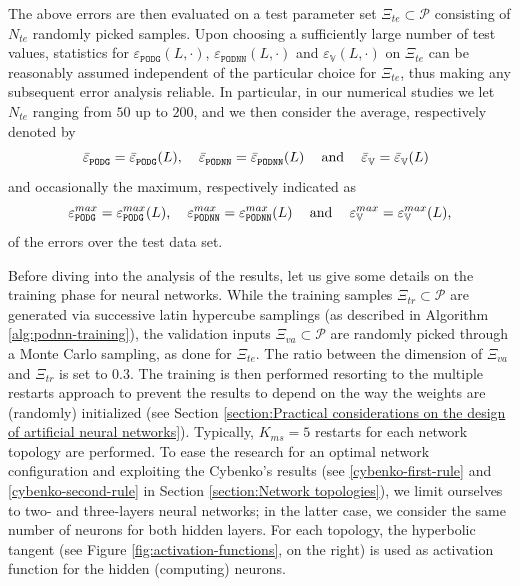 \documentclass[12pt, a4paper, twoside, openright]{report}
\numberwithin{equation}{chapter}
\theoremstyle{theorem}
\theoremstyle{definition}
\theoremstyle{remark}
\theoremstyle{proposition}
\numberwithin{figure}{chapter}
\begin{document}
		The above errors are then evaluated on a test parameter set $\Xi_{te} \subset \mathcal{P}$ consisting of $N_{te}$ randomly picked samples. Upon choosing a sufficiently large number of test values, statistics for $\varepsilon_{\texttt{PODG}}^{}(L, \cdot)$, $\varepsilon_{\texttt{PODNN}}^{}(L, \cdot)$ and $\varepsilon_{\mathbb{V}}^{}(L, \cdot)$ on $\Xi_{te}$ can be reasonably assumed independent of the particular choice for $\Xi_{te}$, thus making any subsequent error analysis reliable. In particular, in our numerical studies we let $N_{te}$ ranging from $50$ up to $200$, and we then consider the average, respectively denoted by
		\begin{equation*}
			\text{$\bar{\varepsilon}_{\texttt{PODG}}^{} = \bar{\varepsilon}_{\texttt{PODG}}^{}(L)$, \hspace*{0.2cm} $\bar{\varepsilon}_{\texttt{PODNN}}^{} = \bar{\varepsilon}_{\texttt{PODNN}}^{}(L)$ \hspace*{0.2cm} and \hspace*{0.2cm} $\bar{\varepsilon}_{\mathbb{V}}^{} = \bar{\varepsilon}_{\mathbb{V}}^{}(L)$ \,}
		\end{equation*} 
		and occasionally the maximum, respectively indicated as
		\begin{equation*}
		 	\text{$\varepsilon_{\texttt{PODG}}^{max} = \varepsilon_{\texttt{PODG}}^{max}(L)$, \hspace*{0.2cm} $\varepsilon_{\texttt{PODNN}}^{max} = \varepsilon_{\texttt{PODNN}}^{max}(L)$ \hspace*{0.2cm} and \hspace*{0.2cm} $\varepsilon_{\mathbb{V}}^{max} = \varepsilon_{\mathbb{V}}^{max}(L)$,} 
		\end{equation*}
		of the errors over the test data set.
		
		Before diving into the analysis of the results, let us give some details on the training phase for neural networks. While the training samples $\Xi_{tr} \subset \mathcal{P}$ are generated via successive latin hypercube samplings (as described in Algorithm \ref{alg:podnn-training}), the validation inputs $\Xi_{va} \subset \mathcal{P}$ are randomly picked through a Monte Carlo sampling, as done for $\Xi_{te}$. The ratio between the dimension of $\Xi_{va}$ and $\Xi_{tr}$ is set to $0.3$. The training is then performed resorting to the multiple restarts approach to prevent the results to depend on the way the weights are (randomly) initialized (see Section \ref{section:Practical considerations on the design of artificial neural networks}). Typically, $K_{ms} = 5$ restarts for each network topology are performed. To ease the research for an optimal network configuration and exploiting the Cybenko's results (see \ref{cybenko-first-rule} and \ref{cybenko-second-rule} in Section \ref{section:Network topologies}), we limit ourselves to two- and three-layers neural networks; in the latter case, we consider the same number of neurons for both hidden layers. For each topology, the hyperbolic tangent (see Figure \ref{fig:activation-functions}, on the right) is used as activation function for the hidden (computing) neurons.  
		
\end{document}
